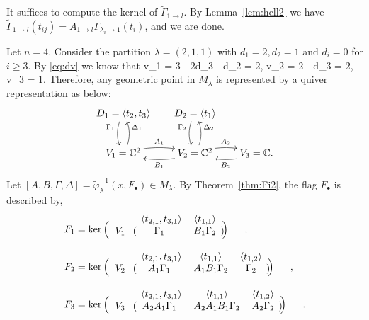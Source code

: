 \documentclass[11pt,reqno]{amsart}
\numberwithin{equation}{section}
\theoremstyle{definition}
\def\<{\langle}
\def\>{\rangle}
\newcommand{\inv}{^{-1}}
\newcommand{\ld}{\lambda}
\newcommand{\tGa}{\widetilde{\Gamma}}
\newcommand{\tphi}{\widetilde{\varphi}}
\begin{document}
\proof
It suffices to compute the kernel of $\tGa_{1\to l}$.
By Lemma~\ref{lem:hell2} we have $\tGa_{1\to l}(t_{ij}) = A_{1\to l}\Gamma_{\ld_i \to 1} (t_i)$, and we are done.
\endproof

\ex\label{ex:Fi211}
Let $n=4$. Consider the partition $\ld = (2,1,1)$ with $d_1 = 2, d_2 =1$ and $d_i = 0$ for $i \geq 3$. By \eqref{eq:dv} we know that
\eq
v_1 = 3 - 2d_3 - d_2 = 2,
\quad
v_2 = 2 - d_3 = 2,
\quad
v_3 = 1.
\endeq
Therefore, any geometric point in $M_\ld$ is represented by a quiver representation  as below:
\begin{equation}\label{eq:211-quiver} 
\xymatrix@C=18pt@R=9pt{
\ar@/_/[dd]_<(0.2){\Gamma_1}
D_1 =\<t_2, t_3\>
&
\ar@/_/[dd]_<(0.2){\Gamma_2}
D_2 =\<t_1\>
&   
\\   
& &    
\\ 
V_1 =\CC^2
	\ar@/^/[r]^{A_1}
	\ar@/_/[uu]_>(0.8){\Delta_1} 
	& 
	\ar@/^/[l]^{B_1} 
V_2  =\CC^2
	\ar@/_/[uu]_>(0.8){\Delta_2} 
	\ar@/^/[r]^{A_{2}}
	& 
	\ar@/^/[l]^{B_2}
V_3 = \CC. 
	}
\end{equation} 
Let $[A,B,\Gamma,\Delta] = \tphi_{\ld}\inv(x, F_\bullet)  \in M_{\ld}$.
By Theorem~\ref{thm:Fi2}, the  flag $F_\bullet$ is described by,
\[
\begin{split}
F_1 &=  
 \ker \Big(\begin{blockarray}{ *{8}{c} }
 & \< t_{2,1}, t_{3,1}\>&\<t_{1,1}\>  \\
\begin{block}{ c @{\quad} ( @{\,} *{7}{c} @{\,} )}
V_{1}& 
\Gamma_1 &B_1\Gamma_2
\\
\end{block}
\end{blockarray}\Big)
\normalsize
~~~~~,
\\
F_2 &= 
 \ker\Big( \begin{blockarray}{ *{8}{c} }
 & \< t_{2,1}, t_{3,1}\>&\<t_{1,1}\> & \<t_{1,2}\> \\
\begin{block}{ c @{\quad} ( @{\,} *{7}{c} @{\,} )}
V_{2}& 
A_1\Gamma_1 &A_1B_1\Gamma_2& \Gamma_2
\\
\end{block}
\end{blockarray}
\Big)\normalsize
~~~~~,
\\
F_3 &= 
 \ker \Big(\begin{blockarray}{ *{8}{c} }
 & \< t_{2,1}, t_{3,1}\>&\<t_{1,1}\> & \<t_{1,2}\> \\
\begin{block}{ c @{\quad} ( @{\,} *{7}{c} @{\,} )}
V_{3}& 
A_2A_1\Gamma_1 &A_2A_1B_1\Gamma_2& A_2\Gamma_2
\\
\end{block}
\end{blockarray}
\Big)\normalsize
~~~~~. 
\end{split}
\]
\end{document}
